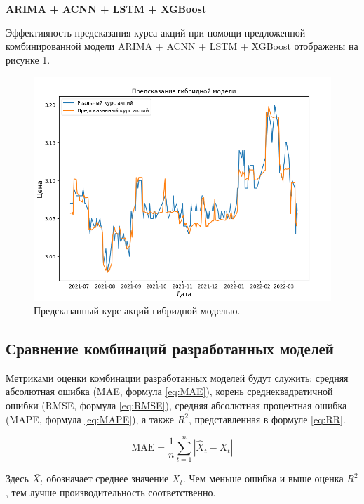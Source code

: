 \newpage
\textbf{ARIMA + ACNN + LSTM + XGBoost}

\par Эффективность предсказания курса акций при помощи предложенной комбинированной модели ARIMA + ACNN + LSTM + XGBoost отображены на рисунке \ref{fig:hybrid-prediction}.

\begin{figure}[hbtp]
  \centering
  \includegraphics[width=\textwidth]{img/hybrid_prediction.png}
  \caption{Предсказанный курс акций гибридной моделью.}
  \label{fig:hybrid-prediction}
\end{figure}

\subsection{Сравнение комбинаций разработанных моделей}
\par Метриками оценки комбинации разработанных моделей будут служить: средняя абсолютная ошибка (MAE, формула \ref{eq:MAE}), корень среднеквадратичной ошибки (RMSE, формула \ref{eq:RMSE}), средняя абсолютная процентная ошибка (MAPE, формула \ref{eq:MAPE}), а также $R^{2}$, представленная в формуле \ref{eq:RR}.

\begin{equation}
    \label{eq:MAE}
    \text{MAE} = \frac{1}{n} \sum_{t=1}^{n} \left |\hat{X}_{t} - X_{t} \right |
\end{equation}

\newpage

\par Здесь $\bar{X_{t}}$ обозначает среднее значение $X_{t}$. Чем меньше ошибка и выше оценка $R^{2}$, тем лучше производительность соответственно.

